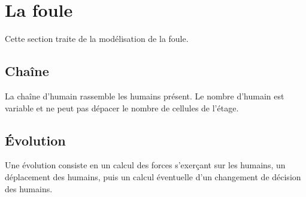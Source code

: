 %
\section{La foule}
%
Cette section traite de la modélisation de la foule.
%
\subsection{Chaîne}
La chaîne d'humain rassemble les humains présent. Le nombre d'humain est variable et ne peut pas dépacer le nombre de cellules de l'étage.
%
\subsection{Évolution}
Une évolution consiste en un calcul des forces s'exerçant sur les humains, un déplacement des humains, puis un calcul éventuelle d'un changement de décision des humains.
%
